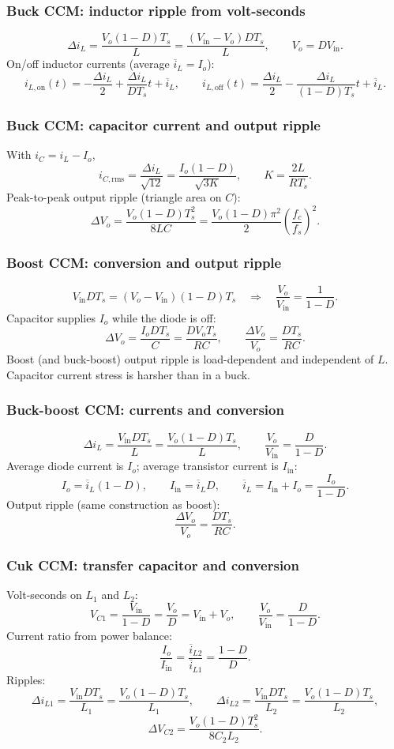 \subsubsection{Buck CCM: inductor ripple from volt-seconds}
\[
\Delta i_L=\frac{V_o(1-D)T_s}{L}=\frac{(V_{\mathrm{in}}-V_o)DT_s}{L},\qquad V_o=D V_{\mathrm{in}}.
\]
On/off inductor currents (average \(\overline{i}_L=I_o\)):
\[
i_{L,\mathrm{on}}(t)=-\frac{\Delta i_L}{2}+\frac{\Delta i_L}{D T_s}t+\overline{i}_L,\qquad
i_{L,\mathrm{off}}(t)=\frac{\Delta i_L}{2}-\frac{\Delta i_L}{(1-D)T_s}t+\overline{i}_L.
\]

\subsubsection{Buck CCM: capacitor current and output ripple}
With \(i_C=i_L-I_o\),
\[
i_{C,\mathrm{rms}}=\frac{\Delta i_L}{\sqrt{12}}=\frac{I_o(1-D)}{\sqrt{3K}},\qquad K=\frac{2L}{R T_s}.
\]
Peak-to-peak output ripple (triangle area on \(C\)):
\[
\Delta V_o=\frac{V_o(1-D)T_s^2}{8LC}=\frac{V_o(1-D)\pi^2}{2}\left(\frac{f_c}{f_s}\right)^2.
\]

\subsubsection{Boost CCM: conversion and output ripple}
\[
V_{\mathrm{in}} D T_s=(V_o-V_{\mathrm{in}})(1-D)T_s \quad\Rightarrow\quad \frac{V_o}{V_{\mathrm{in}}}=\frac{1}{1-D}.
\]
Capacitor supplies \(I_o\) while the diode is off:
\[
\Delta V_o=\frac{I_o D T_s}{C}=\frac{D V_o T_s}{RC},\qquad \frac{\Delta V_o}{V_o}=\frac{D T_s}{RC}.
\]
Boost (and buck-boost) output ripple is load-dependent and independent of \(L\). Capacitor current stress is harsher than in a buck.

\subsubsection{Buck-boost CCM: currents and conversion}
\[
\Delta i_L=\frac{V_{\mathrm{in}} D T_s}{L}=\frac{V_o(1-D)T_s}{L},\qquad \frac{V_o}{V_{\mathrm{in}}}=\frac{D}{1-D}.
\]
Average diode current is \(I_o\); average transistor current is \(I_{\mathrm{in}}\):
\[
I_o=\overline{i}_L(1-D),\qquad I_{\mathrm{in}}=\overline{i}_L D,\qquad \overline{i}_L=I_{\mathrm{in}}+I_o=\frac{I_o}{1-D}.
\]
Output ripple (same construction as boost):
\[
\frac{\Delta V_o}{V_o}=\frac{D T_s}{RC}.
\]

\subsubsection{Cuk CCM: transfer capacitor and conversion}
Volt-seconds on \(L_1\) and \(L_2\):
\[
V_{C1}=\frac{V_{\mathrm{in}}}{1-D}=\frac{V_o}{D}=V_{\mathrm{in}}+V_o,\qquad \frac{V_o}{V_{\mathrm{in}}}=\frac{D}{1-D}.
\]
Current ratio from power balance:
\[
\frac{I_o}{I_{\mathrm{in}}}=\frac{\overline{i}_{L2}}{\overline{i}_{L1}}=\frac{1-D}{D}.
\]
Ripples:
\[
\Delta i_{L1}=\frac{V_{\mathrm{in}} D T_s}{L_1}=\frac{V_o(1-D)T_s}{L_1},\qquad
\Delta i_{L2}=\frac{V_{\mathrm{in}} D T_s}{L_2}=\frac{V_o(1-D)T_s}{L_2},
\]
\[
\Delta V_{C2}=\frac{V_o(1-D)T_s^2}{8 C_2 L_2}.
\]

